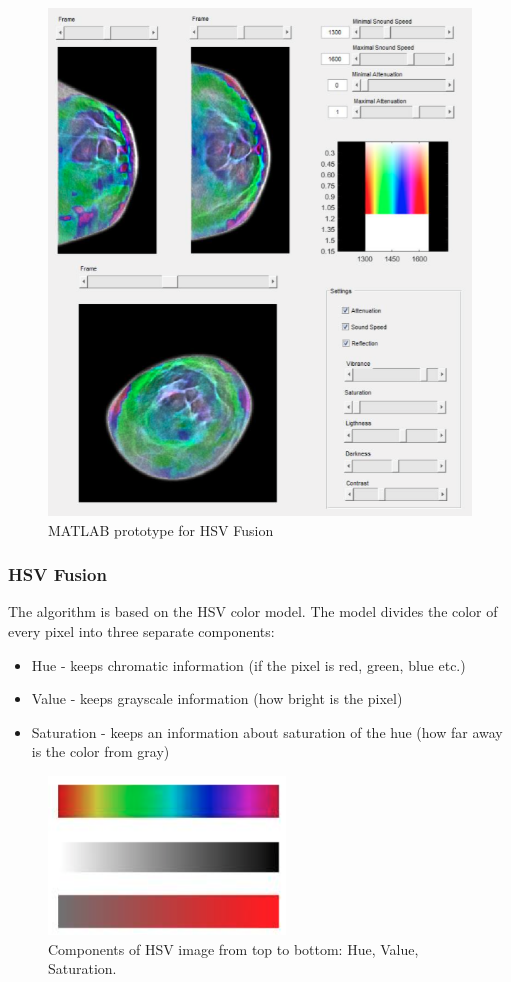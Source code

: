\documentclass[english]{article}
\begin{document}
\begin{figure}
\centerline{\includegraphics[scale=0.4]{internship_report/pro}}
\caption{MATLAB prototype for HSV Fusion\label{fig:pro}}
\end{figure}
\subsubsection{HSV Fusion}

The algorithm is based on the HSV color model. The model divides the color of every pixel into three separate components:

\begin{itemize}
\item Hue - keeps chromatic information (if the pixel is red, green, blue etc.)
\item Value - keeps grayscale information (how bright is the pixel)
\item Saturation - keeps an information about saturation of the hue (how far away is the color from gray)
\end{itemize}

\begin{figure}[H]
\centerline{\includegraphics[scale=0.6]{internship_report/hsv}}
\caption{Components of HSV image from top to bottom: Hue, Value, Saturation.\label{fig:hsv}}
\end{figure}
\end{document}
